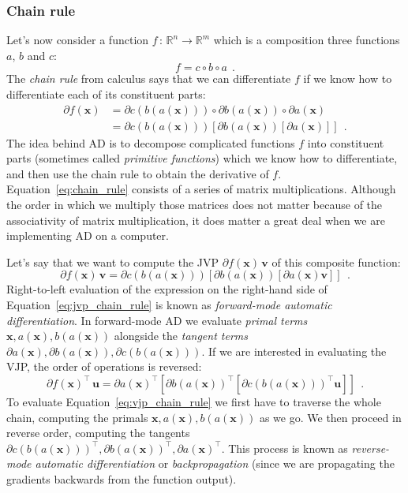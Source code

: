 \documentclass[12pt,dvipsnames]{report}
\renewcommand{\vec}[1]{\boldsymbol{\mathbf{#1}}}
\newcommand{\hquad}{~~}
\begin{document}
\subsubsection{Chain rule}
Let's now consider a function $f\,:\, \mathbb{R}^n\rightarrow\mathbb{R}^m$ which is a composition
three functions $a$, $b$ and $c$:
\begin{equation}
f=c \circ b \circ a
\hquad.
\end{equation}
The \emph{chain rule} from calculus says that we can differentiate $f$ if we know how to differentiate 
each of its constituent parts:
\begin{align}
\partial f(\vec{x})&=\partial c(b(a(\vec{x}))) \circ \partial b(a(\vec{x})) \circ \partial a(\vec{x})\\
&=\partial c(b(a(\vec{x})))[\partial b(a(\vec{x}))[\partial a(\vec{x})]]
\hquad.
\label{eq:chain_rule}
\end{align}
The idea behind AD is to decompose complicated functions $f$ into constituent parts (sometimes 
called \emph{primitive functions}) which we know how to differentiate, and then use the chain 
rule to obtain the derivative of $f$.
Equation~\ref{eq:chain_rule} consists of a series of matrix multiplications. Although the order
in which we multiply those matrices does not matter because of the associativity of matrix 
multiplication, it does matter a great deal when we are implementing AD on a computer.

Let's say that we want to compute the JVP $\partial f(\vec{x})\,\vec v$ of this composite 
function:
\begin{equation}
 \partial f(\vec{x})\,\vec v = \partial c(b(a(\vec{x})))[\partial b(a(\vec{x}))[\partial a(\vec{x})\vec v]]
 \hquad.
 \label{eq:jvp_chain_rule}
\end{equation}
Right-to-left evaluation of the expression on the right-hand side of 
Equation~\ref{eq:jvp_chain_rule} is known  as \emph{forward-mode automatic differentiation}.
In forward-mode AD we evaluate \emph{primal terms} $\vec{x}, a(\vec{x}), b(a(\vec{x}))$ 
alongside the \emph{tangent terms} 
$\partial a(\vec{x}), \partial b(a(\vec{x})), \partial c(b(a(\vec{x})))$.
If we are interested in evaluating the VJP, the order of operations is reversed:
\begin{equation}
\partial f(\vec{x})^{\intercal}\,\vec u=\partial a(\vec{x})^{\intercal}\left[\partial b(a(\vec{x}))^\intercal\left[\partial c(b(a(\vec{x})))^{\intercal}\vec u\right]\right]
\hquad.
\label{eq:vjp_chain_rule}
\end{equation}
To evaluate  Equation~\ref{eq:vjp_chain_rule} we first have to traverse the whole chain,
computing the primals $\vec{x}, a(\vec{x}), b(a(\vec{x}))$ as we go. We then proceed 
in reverse order, computing the tangents 
$\partial c(b(a(\vec{x})))^{\intercal}, \partial b(a(\vec{x}))^{\intercal}, \partial a(\vec{x})^{\intercal}$.
This process is known as \emph{reverse-mode automatic differentiation} or 
\emph{backpropagation} (since we are propagating the gradients backwards from the function output).
\end{document}
